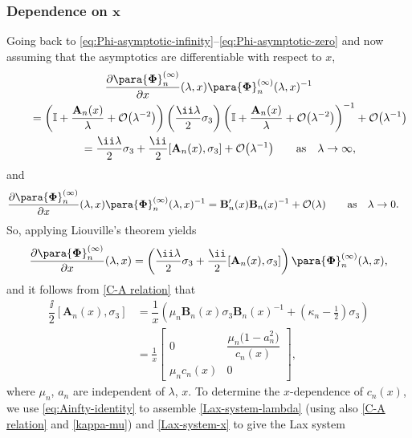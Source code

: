 \subsubsection[Dependence on x]{Dependence on $\boldsymbol{x}$}
Going back to \eqref{eq:Phi-asymptotic-infinity}--\eqref{eq:Phi-asymptotic-zero} and now assuming that the asymptotics are differentiable with respect to $x$,
\begin{gather*}
 \frac{\partial\para{\boldsymbol \Phi}^{(\infty)}_n}{\partial x}(\lambda,x) \para{\boldsymbol \Phi}_n^{(\infty)} (\lambda,x)^{-1}\\
 \qquad= \left(\mathbb I + \dfrac{\mathbf{A}_{n}(x)}{\lambda} + \mathcal{O}\big( \lambda^{-2}\big) \right) \left( \dfrac{\ii \lambda}{2}\sigma_3 \right)\left(\mathbb I + \dfrac{\mathbf{A}_{n}(x)}{\lambda} + \mathcal{O}\big( \lambda^{-2}\big)\right)^{-1} + \mathcal{O}\big( \lambda^{-1} \big)\\
 \qquad = \dfrac{\ii \lambda}{2} \sigma_3 + \dfrac{\ii}{2} [\mathbf{A}_{n}(x), \sigma_3] + \mathcal{O}\big( \lambda^{-1} \big) \qquad \text{as} \quad \lambda \to \infty,
\end{gather*}
and
\begin{align*}
 \frac{\partial\para{\boldsymbol \Phi}^{(\infty)}_n}{\partial x}(\lambda,x) \para{\boldsymbol \Phi}_n^{(\infty)}(\lambda,x)^{-1} &= \mathbf{B}_n'(x) \mathbf{B}_n(x)^{-1} + \mathcal{O}(\lambda) \qquad \text{as} \quad \lambda \to 0.
\end{align*}
So, applying Liouville's theorem yields
\begin{equation}
 \frac{\partial\para{\boldsymbol \Phi}^{(\infty)}_{n}}{\partial x} (\lambda,x) = \left( \dfrac{\ii \lambda}{2} \sigma_3 + \dfrac{\ii}{2} [\mathbf{A}_n(x), \sigma_3] \right) \para{\boldsymbol \Phi}_n^{(\infty)}(\lambda,x),
 \label{Lax-system-x}
\end{equation}
and it follows from \eqref{C-A relation} that
\begin{align}
\dfrac{\ii}{2}[\mathbf{A}_n(x), \sigma_3] &= \dfrac{1}{x} \left( \mu_n\mathbf{B}_n(x) \sigma_3 \mathbf{B}_n(x)^{-1} +\left(\kappa_n-\frac{1}{2}\right) \sigma_3 \right)\nonumber\\
& = \frac{1}{x}\begin{bmatrix} 0 & \dfrac{\mu_n\big(1 - a_n^2\big)}{c_n(x)} \\ \mu_n c_n(x) & 0 \end{bmatrix},
\label{eq:Ainfty-identity}
\end{align}
where $\mu_n$, $a_n$ are independent of $\lambda$, $x$. To determine the $x$-dependence of $c_n(x)$, we use \eqref{eq:Ainfty-identity} to assemble \eqref{Lax-system-lambda} (using also \eqref{C-A relation} and \eqref{kappa-mu}) and \eqref{Lax-system-x} to give the Lax system
